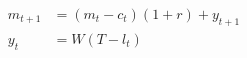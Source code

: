   \begin{align}
    m_{t+1} & = (m_t -c_t)(1+r) + y_{t+1} \label{eq:savings} \\
    y_t &= W(T-l_t) \label{eq:earnings}
  \end{align}
